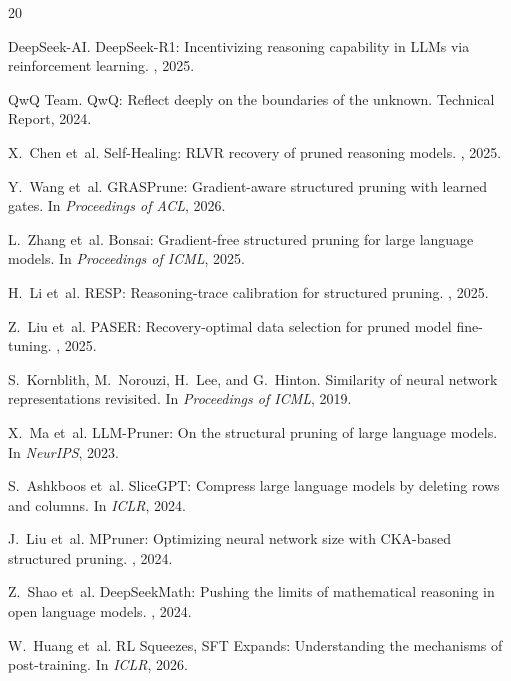 \documentclass[11pt,a4paper]{article}
\begin{document}

\begin{thebibliography}{20}

DeepSeek-AI.
\newblock DeepSeek-R1: Incentivizing reasoning capability in LLMs via reinforcement learning.
, 2025.

QwQ Team.
\newblock QwQ: Reflect deeply on the boundaries of the unknown.
\newblock Technical Report, 2024.

X.~Chen et~al.
\newblock Self-Healing: RLVR recovery of pruned reasoning models.
, 2025.

Y.~Wang et~al.
\newblock GRASPrune: Gradient-aware structured pruning with learned gates.
\newblock In {\em Proceedings of ACL}, 2026.

L.~Zhang et~al.
\newblock Bonsai: Gradient-free structured pruning for large language models.
\newblock In {\em Proceedings of ICML}, 2025.

H.~Li et~al.
\newblock RESP: Reasoning-trace calibration for structured pruning.
, 2025.

Z.~Liu et~al.
\newblock PASER: Recovery-optimal data selection for pruned model fine-tuning.
, 2025.

S.~Kornblith, M.~Norouzi, H.~Lee, and G.~Hinton.
\newblock Similarity of neural network representations revisited.
\newblock In {\em Proceedings of ICML}, 2019.

X.~Ma et~al.
\newblock LLM-Pruner: On the structural pruning of large language models.
\newblock In {\em NeurIPS}, 2023.

S.~Ashkboos et~al.
\newblock SliceGPT: Compress large language models by deleting rows and columns.
\newblock In {\em ICLR}, 2024.

J.~Liu et~al.
\newblock MPruner: Optimizing neural network size with CKA-based structured pruning.
, 2024.

Z.~Shao et~al.
\newblock DeepSeekMath: Pushing the limits of mathematical reasoning in open language models.
, 2024.

W.~Huang et~al.
\newblock RL Squeezes, SFT Expands: Understanding the mechanisms of post-training.
\newblock In {\em ICLR}, 2026.

\end{thebibliography}
\end{document}
